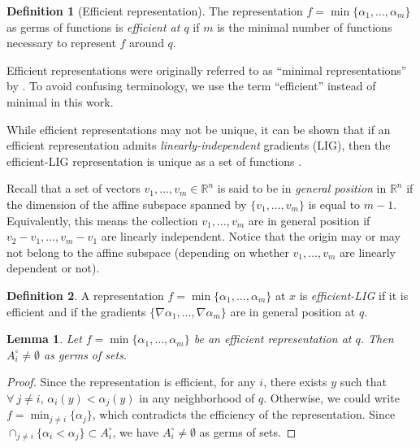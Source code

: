 \documentclass[11pt]{article}
\newcommand{\R}{\mathbb{R}}
\newcommand{\inter}{\cap}
\newcommand{\grad}{\nabla}
\theoremstyle{plain}
\newtheorem{lem}{Lemma}
\theoremstyle{definition}
\newtheorem{defi}{Definition}
\theoremstyle{remark}
\begin{document}
\begin{defi}[Efficient representation]
	The representation $f = \min \{ \alpha_1, \ldots, \alpha_m\}$ as germs of functions is \emph{efficient at $q$} if $m$ is the minimal number of functions necessary to represent $f$ around $q$. \label{def:efficient_repr}
\end{defi}

Efficient representations were originally referred to as ``minimal representations'' by \cite{gershkovich_morse_1997}. To avoid confusing terminology, we use the term ``efficient'' instead of minimal in this work. 

While efficient representations may not be unique, it can be shown that if an efficient representation admits \emph{linearly-independent} gradients (LIG), then the efficient-LIG representation is unique as a set of functions \citep{gershkovich_morse_1997}. 

Recall that a set of vectors $v_1,\ldots,v_m \in \R^n$ is said to be in \emph{general position} in $\R^n$ if the dimension of the affine subspace spanned by $\{v_1,\ldots,v_m\}$ is equal to $m-1$.  Equivalently, this means the collection $v_1,\ldots, v_m$ are in general position if $v_2 - v_1, \ldots, v_m - v_1$ are linearly independent.  Notice that the origin may or may not belong to the affine subspace (depending on whether $v_1,\ldots,v_m$ are linearly dependent or not).

\begin{defi}
	\label{def:LIG}
	A representation $f = \min \{\alpha_1,\ldots,\alpha_m\}$ at $x$ is \emph{efficient-LIG} if it is efficient and if the gradients $\{\grad \alpha_1,\ldots,\grad \alpha_m\}$ are in general position at $q$.
\end{defi}


\begin{lem}
	\label{lem:efficient_non_empty}
	 Let $f = \min \{\alpha_1,\ldots,\alpha_m\}$ be an efficient representation at $q$. Then $A_i^\circ \neq \emptyset$ as germs of sets.
\end{lem}
\begin{proof}
	Since the representation is efficient, for any $i$, there exists $y$ such that $\forall\ j \neq i,\, \alpha_i(y) < \alpha_j(y)$ in any neighborhood of $q$. Otherwise, we could write $f = \min_{j \neq i} \{ \alpha_j\}$, which contradicts the efficiency of the representation. Since $\inter_{j \neq i} \{\alpha_i < \alpha_j\} \subset A_i^\circ$, we have $A_i^\circ \neq \emptyset$ as germs of sets.
\end{proof}
\end{document}
